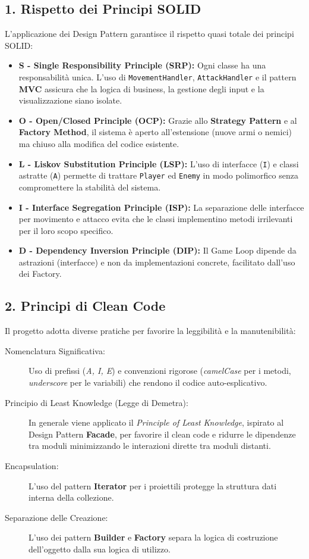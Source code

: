 \documentclass[12pt,a4paper]{article}
\begin{document}
\begin{small}
\subsection*{1. Rispetto dei Principi SOLID}

L'applicazione dei Design Pattern garantisce il rispetto quasi totale dei principi SOLID:

\begin{itemize}
    \item \textbf{S - Single Responsibility Principle (SRP):} Ogni classe ha una responsabilità unica. L'uso di \texttt{MovementHandler}, \texttt{AttackHandler} e il pattern \textbf{MVC} assicura che la logica di business, la gestione degli input e la visualizzazione siano isolate.
    \item \textbf{O - Open/Closed Principle (OCP):} Grazie allo \textbf{Strategy Pattern} e al \textbf{Factory Method}, il sistema è aperto all'estensione (nuove armi o nemici) ma chiuso alla modifica del codice esistente.
    \item \textbf{L - Liskov Substitution Principle (LSP):} L'uso di interfacce (\texttt{I}) e classi astratte (\texttt{A}) permette di trattare \texttt{Player} ed \texttt{Enemy} in modo polimorfico senza compromettere la stabilità del sistema.
    \item \textbf{I - Interface Segregation Principle (ISP):} La separazione delle interfacce per movimento e attacco evita che le classi implementino metodi irrilevanti per il loro scopo specifico.
    \item \textbf{D - Dependency Inversion Principle (DIP):} Il Game Loop dipende da astrazioni (interfacce) e non da implementazioni concrete, facilitato dall'uso dei Factory.
\end{itemize}

\subsection*{2. Principi di Clean Code}

Il progetto adotta diverse pratiche per favorire la leggibilità e la manutenibilità:

\begin{description}
    \item[Nomenclatura Significativa:] Uso di prefissi (\textit{A, I, E}) e convenzioni rigorose (\textit{camelCase} per i metodi, \textit{underscore} per le variabili) che rendono il codice auto-esplicativo.
    \item[Principio di Least Knowledge (Legge di Demetra):] In generale viene applicato il \textit{Principle of Least Knowledge}, ispirato al Design Pattern
    \textbf{Facade}, per favorire il clean code e ridurre le       dipendenze tra moduli minimizzando le interazioni dirette tra moduli distanti.
    \item[Encapsulation:] L'uso del pattern \textbf{Iterator} per i proiettili protegge la struttura dati interna della collezione.
    \item[Separazione delle Creazione:] L'uso dei pattern \textbf{Builder} e \textbf{Factory} separa la logica di costruzione dell'oggetto dalla sua logica di utilizzo.
\end{description}


\end{small}
\end{document}
